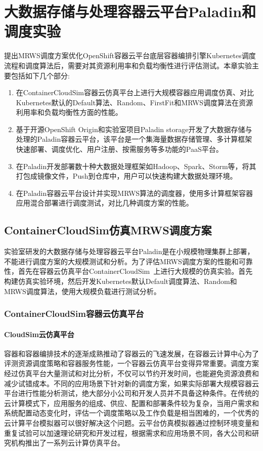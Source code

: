 \chapter{大数据存储与处理容器云平台Paladin和调度实验}
提出MRWS调度方案优化OpenShift容器云平台底层容器编排引擎Kubernetes调度流程和调度算法后，需要对其资源利用率和负载均衡性进行评估测试。本章实验主要包括如下几个部分:
\begin{enumerate}[(1)]
	\item 在ContainerCloudSim容器云仿真平台上进行大规模容器应用调度仿真、对比Kubernetes默认的Default算法、Random、FirstFit和MRWS调度算法在资源利用率和负载均衡性方面的性能。
	\item 基于开源OpenShift Origin和实验室项目Paladin storage开发了大数据存储与处理的Paladin容器云平台，该平台是一个集海量数据存储管理、多计算框架快速部署、调度优化、用户注册、按需服务等多功能的PaaS平台。
	\item 在Paladin开发部署数十种大数据处理框架如Hadoop、Spark、Storm等，将其打包成镜像文件，Push到仓库中，用户可以快速构建大数据处理环境。
	\item 在Paladin容器云平台设计并实现MRWS算法的调度器，使用多计算框架容器应用混合部署进行调度测试，对比几种调度方案的性能。
\end{enumerate}

\section{ContainerCloudSim仿真MRWS调度方案}
实验室研发的大数据存储与处理容器云平台Paladin是在小规模物理集群上部署，不能进行调度方案的大规模测试和分析。为了评估MRWS调度方案的性能和可靠性，首先在容器云仿真平台ContainerCloudSim~\cite{Piraghaj2016ContainerCloudSim}上进行大规模的仿真实验。首先构建仿真实验环境，然后开发Kubernetes默认Default调度算法、Random和MRWS调度算法，使用大规模负载进行测试分析。

\subsection{ContainerCloudSim容器云仿真平台}
\subsubsection{CloudSim云仿真平台}
容器和容器编排技术的逐渐成熟推动了容器云的飞速发展，在容器云计算中心为了评测资源调度策略和容器服务性能，一个容器云仿真平台变得异常重要。调度方案经过仿真平台大量测试和对比分析，不仅可以节约开发时间，也能避免资源浪费和减少试错成本。不同的应用场景下针对新的调度方案，如果实际部署大规模容器云平台进行性能分析测试，绝大部分小公司和开发人员并不具备这种条件。在传统的云计算模式下，应用服务的组成、供应、配置和部署条件较为复杂，当用户需求和系统配置动态变化时，评估一个调度策略以及工作负载是相当困难的，一个优秀的云计算平台模拟器可以很好解决这个问题。云平台仿真模拟器通过控制环境变量和重复试验可以加速理论研究和开发过程，根据需求和应用场景不同，各大公司和研究机构推出了一系列云计算仿真平台。

